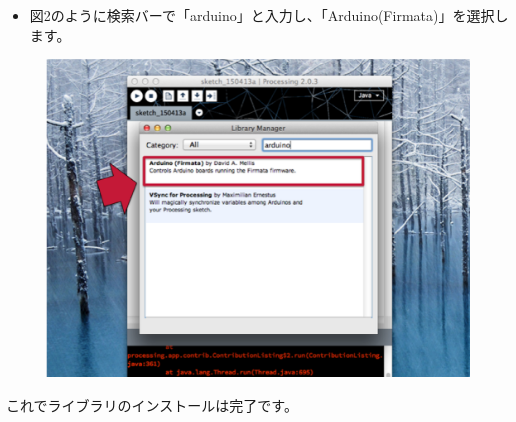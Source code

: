\documentclass[11pt,a4paper]{jarticle}
\begin{document}
\newpage

\begin{itemize}
\item 図2のように検索バーで「arduino」と入力し、「Arduino(Firmata)」を選択します。
\end{itemize}

\begin{figure}[htbp]
  \centering
  \includegraphics[width=0.75\columnwidth]{img/library02.eps}
  \label{figure:switch}
\end{figure}

これでライブラリのインストールは完了です。




\end{document}
